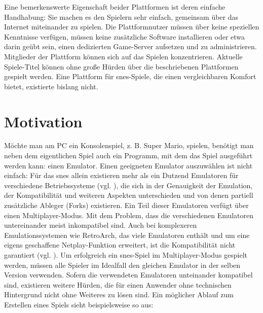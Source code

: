 Eine bemerkenswerte Eigenschaft beider Plattformen ist deren einfache
Handhabung: Sie machen es den Spielern sehr einfach, gemeinsam über das
Internet miteinander zu spielen. Die Plattformnutzer müssen über keine
speziellen Kenntnisse verfügen, müssen keine zusätzliche Software
installieren oder etwa darin geübt sein, einen dedizierten Game-Server
aufsetzen und zu administrieren. Mitglieder der Plattform können sich
auf das Spielen konzentrieren. Aktuelle Spiele-Titel können ohne große
Hürden über die beschriebenen Plattformen gespielt werden. Eine
Plattform für \gls{snes}-Spiele, die einen vergleichbaren Komfort
bietet, existierte bislang nicht.

\section{Motivation}\label{motivation}

Möchte man am PC ein Konsolenspiel, z. B. Super Mario, spielen, benötigt
man neben dem eigentlichen Spiel auch ein Programm, mit dem das Spiel
ausgeführt werden kann: einen Emulator. Einen geeigneten Emulator
auszuwählen ist nicht einfach: Für das \gls{snes} allein existieren mehr
als ein Dutzend Emulatoren für verschiedene Betriebssysteme (vgl.
\cite{snes-emulator-list}), die sich in der Genauigkeit der Emulation,
der Kompatibilität und weiteren Aspekten unterschieden und von denen
partiell zusätzliche Ableger (Forks) existieren\todo{}. Ein Teil dieser
Emulatoren verfügt über einen Multiplayer-Modus. Mit dem Problem, dass
die verschiedenen Emulatoren untereinander meist inkompatibel
sind\todo{}. Auch bei komplexeren Emulationssystemen wie RetroArch, das
viele Emulatoren enthält und um eine eigens geschaffene Netplay-Funktion
erweitert, ist die Kompatibilität nicht garantiert (vgl.
\cite{retroarch-netplay-comp}). Um erfolgreich ein \gls{snes}-Spiel im
Multiplayer-Modus gespielt werden, müssen alle Spieler im Idealfall den
gleichen Emulator in der selben Version verwenden. Sofern die
verwendeten Emulatoren unteinander kompatibel sind, existieren weitere
Hürden, die für einen Anwender ohne technischen Hintergrund nicht ohne
Weiteres zu lösen sind. Ein möglicher Ablauf zum Erstellen eines Spiels
sieht beispielsweise so aus:

